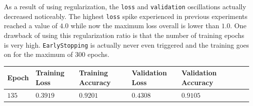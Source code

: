 \documentclass[11pt,a4paper]{article}
\begin{document}
\noindent
 As a result of using regularization, the \texttt{loss} and \texttt{validation} oscillations actually decreased noticeably. The highest \texttt{loss} spike experienced in previous experiments reached a value of $4.0$ while now the maximum loss overall is lower than $1.0$. One drawback of using this regularization ratio is that the number of training epochs is very high. \texttt{EarlyStopping} is actually never even triggered and the training goes on for the maximum of $300$ epochs.
\begin{center}
\hspace*{-0.8cm}
\begin{tabular}{|p{1.2cm}|p{1.8cm}|p{2cm}|p{2cm}|p{2cm}|p{2cm}|p{2cm}|}
\rowcolor{gray!50}
\hline
\textbf{Epoch} & \textbf{Training Loss} & \textbf{Training Accuracy} & \textbf{Validation Loss} & \textbf{Validation Accuracy}\\
\hline
$135$ & $0.3919$ & $0.9201$ & $0.4308$ & $0.9105$\\
\hline
\end{tabular}\\
\end{center}
\end{document}

